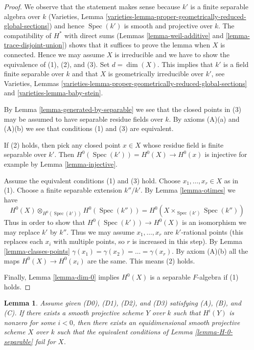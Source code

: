 \documentclass{stacks-project}
\theoremstyle{plain}
\newtheorem{lemma}[subsection]{Lemma}
\theoremstyle{definition}
\theoremstyle{remark}
\numberwithin{equation}{subsection}
\def\Spec{\mathop{\mathrm{Spec}}}
\begin{document}
\begin{proof}
We observe that the statement makes sense because $k'$ is a finite separable
algebra over $k$ (Varieties, Lemma
\ref{varieties-lemma-proper-geometrically-reduced-global-sections})
and hence $\Spec(k')$ is smooth and projective over $k$.
The compatibility of $H^*$ with direct sums
(Lemmas \ref{lemma-weil-additive} and \ref{lemma-trace-disjoint-union})
shows that it suffices to prove the lemma when $X$ is connected.
Hence we may assume $X$ is irreducible and we have to show the
equivalence of (1), (2), and (3). Set $d = \dim(X)$.
This implies that $k'$ is a field finite separable
over $k$ and that $X$ is geometrically irreducible over $k'$, see
Varieties, Lemmas
\ref{varieties-lemma-proper-geometrically-reduced-global-sections} and
\ref{varieties-lemma-baby-stein}.

\medskip\noindent
By Lemma \ref{lemma-generated-by-separable} we see that the closed
points in (3) may be assumed to have separable residue fields over $k$.
By axioms (A)(a) and (A)(b) we see that conditions (1) and (3) are equivalent.

\medskip\noindent
If (2) holds, then pick any closed point $x \in X$ whose residue field
is finite separable over $k'$. Then
$H^0(\Spec(k')) = H^0(X) \to H^0(x)$ is injective for example by
Lemma \ref{lemma-injective}.

\medskip\noindent
Assume the equivalent conditions (1) and (3) hold. Choose
$x_1, \ldots, x_r \in X$ as in (1). Choose a finite separable
extension $k''/k'$. By Lemma \ref{lemma-otimes} we have
$$
H^0(X) \otimes_{H^0(\Spec(k'))} H^0(\Spec(k'')) =
H^0(X \times_{\Spec(k')} \Spec(k''))
$$
Thus in order to show that
$H^0(\Spec(k')) \to H^0(X)$ is an isomorphism
we may replace $k'$ by $k''$. Thus we may assume $x_1, \ldots, x_r$
are $k'$-rational points (this replaces each $x_i$ with multiple
points, so $r$ is increased in this step). By Lemma \ref{lemma-classes-points}
$\gamma(x_1) = \gamma(x_2) = \ldots = \gamma(x_r)$.
By axiom (A)(b) all the maps $H^0(X) \to H^0(x_i)$
are the same. This means (2) holds.

\medskip\noindent
Finally, Lemma \ref{lemma-dim-0} implies
$H^0(X)$ is a separable $F$-algebra if (1) holds.
\end{proof}

\begin{lemma}
\label{lemma-negative-cohomology}
Assume given (D0), (D1), (D2), and (D3) satisfying (A), (B), and (C).
If there exists a smooth projective scheme $Y$ over $k$ such that
$H^i(Y)$ is nonzero for some $i < 0$, then there exists an equidimensional
smooth projective scheme $X$ over $k$ such that the equivalent conditions
of Lemma \ref{lemma-H-0-separable} fail for $X$.
\end{lemma}
\end{document}
